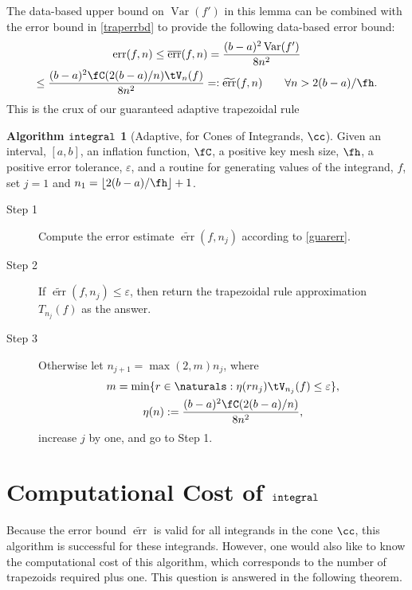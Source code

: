 \documentclass[]{article}
\DeclareMathOperator{\integ}{\texttt{\textup{integral}}}
\DeclareMathOperator{\Var}{Var}
\DeclareMathOperator{\err}{err}
\newcommand{\oerr}{\overline{\err}}
\newcommand{\terr}{\widetilde{\err}}
\theoremstyle{definition}
\newtheorem*{guaralgo}{Algorithm $\integ$}
\theoremstyle{remark}
\newcommand{\hcut}{\fh}
\begin{document}
The data-based upper bound on $\Var(f')$ in this lemma can be combined with the error bound in \eqref{traperrbd} to provide the following data-based error bound:
\begin{multline}\label{guarerr}
\err(f,n) \le \oerr(f,n) = \frac{(b-a)^2 \Var(f')}{8 n^2} \\ \le  \frac{(b-a)^2 \fC(2(b-a)/n) \tV_n(f)}{8 n^2} =: \terr(f,n) \qquad \forall n>2(b-a)/\hcut.
\end{multline}
This is the crux of our guaranteed adaptive trapezoidal rule 

\begin{guaralgo} [Adaptive, for Cones of Integrands, $\cc$] Given an interval, $[a,b]$, an inflation function, $\fC$, a positive key mesh size, $\hcut$, a positive error tolerance, $\varepsilon$, and a routine for generating values of the integrand, $f$, set $j=1$ and $n_1 = \left \lfloor 2(b-a)/\hcut \right \rfloor +1$.
\begin{description}
\item[Step 1] Compute the error estimate $\terr(f,n_j)$ according to \eqref{guarerr}.

\item [Step 2] If $\terr(f,n_j) \le \varepsilon$, then return the trapezoidal rule approximation $T_{n_j}(f)$ as the answer.  

\item [Step 3] Otherwise let $n_{j+1} = \max(2,m) n_j$, where
\begin{multline}\label{conealgom}
m = \min\{ r \in \naturals : \eta(rn_j) \tV_{n_j}(f) \le  \varepsilon \}, \\ \eta(n):= \frac{(b-a)^2 \fC(2(b-a)/n)}{8 n^2}, 
\end{multline}
increase $j$ by one, and go to Step 1.

\end{description}
\end{guaralgo}

\section{Computational Cost of $\integ$}
Because the error bound $\terr$ is valid for all integrands in the cone $\cc$, this algorithm is successful for these integrands.  However, one would also like to know the computational cost of this algorithm, which corresponds to the number of trapezoids required plus one.  This question is answered in the following theorem.
\end{document}
